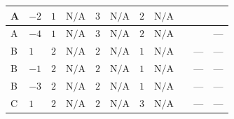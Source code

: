 \documentclass[8pt]{article}
\begin{document}
\begin{landscape}
\begin{longtable}{@{}llcccccc >{\raggedright\arraybackslash}p{0.21\linewidth} >{\raggedright\arraybackslash}p{0.21\linewidth} >{\raggedright\arraybackslash}p{0.21\linewidth}@{}}
\midrule
A & $-2$ & $1$ & $\text{N/A}$ & $3$ & $\text{N/A}$ & $2$ & $\text{N/A}$ & \scriptsize\adjustbox{max width=\linewidth}{$\begin{gathered} +8 {\lambda_{HS_2}^{(1)}} {\lambda_{S_2}^{(1)}}\end{gathered}$} & \scriptsize\adjustbox{max width=\linewidth}{$\begin{gathered} +6 {\lambda_{HS_2}^{(A)}}^2\end{gathered}$} & \scriptsize\adjustbox{max width=\linewidth}{$\begin{gathered} +20 {\lambda_{X_{2}}} \left({\lambda_{X_{16}}}\right)^{*}\end{gathered}$} \\
\midrule
A & $-4$ & $1$ & $\text{N/A}$ & $3$ & $\text{N/A}$ & $2$ & $\text{N/A}$ & \scriptsize\adjustbox{max width=\linewidth}{$\begin{gathered} +8 {\lambda_{HS_2}^{(1)}} {\lambda_{S_2}^{(1)}}\end{gathered}$} & \scriptsize\adjustbox{max width=\linewidth}{$\begin{gathered} +6 {\lambda_{HS_2}^{(A)}}^2\end{gathered}$} & --- \\
\midrule
B & $1$ & $2$ & $\text{N/A}$ & $2$ & $\text{N/A}$ & $1$ & $\text{N/A}$ & \scriptsize\adjustbox{max width=\linewidth}{$\begin{gathered} +6 {\lambda_{HS_2}^{(1)}} {\lambda_{S_2}^{(1)}}\end{gathered}$} & --- & --- \\
\midrule
B & $-1$ & $2$ & $\text{N/A}$ & $2$ & $\text{N/A}$ & $1$ & $\text{N/A}$ & \scriptsize\adjustbox{max width=\linewidth}{$\begin{gathered} +6 {\lambda_{HS_2}^{(1)}} {\lambda_{S_2}^{(1)}}\end{gathered}$} & --- & --- \\
\midrule
B & $-3$ & $2$ & $\text{N/A}$ & $2$ & $\text{N/A}$ & $1$ & $\text{N/A}$ & \scriptsize\adjustbox{max width=\linewidth}{$\begin{gathered} +6 {\lambda_{HS_2}^{(1)}} {\lambda_{S_2}^{(1)}}\end{gathered}$} & --- & --- \\
\midrule
C & $1$ & $2$ & $\text{N/A}$ & $2$ & $\text{N/A}$ & $3$ & $\text{N/A}$ & \scriptsize\adjustbox{max width=\linewidth}{$\begin{gathered} +6 {\lambda_{HS_2}^{(1)}} {\lambda_{S_2}^{(1)}}\end{gathered}$} & --- & --- \\

\end{longtable}
\end{landscape}
\end{document}
